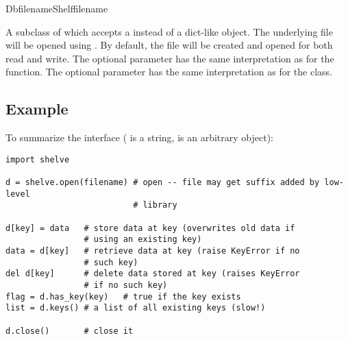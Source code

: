 \begin{classdesc}{DbfilenameShelf}{filename}

A subclass of  which accepts a  instead of a
dict-like object.  The underlying file will be opened using
{}.  By default, the file will be created and opened
for both read and write.  The optional  parameter has the same
interpretation as for the  function.  The optional
 parameter has the same interpretation as for the
{} class.
\end{classdesc}

\subsection{Example}

To summarize the interface ( is a string,  is an
arbitrary object):

\begin{verbatim}
import shelve

d = shelve.open(filename) # open -- file may get suffix added by low-level
                          # library

d[key] = data   # store data at key (overwrites old data if
                # using an existing key)
data = d[key]   # retrieve data at key (raise KeyError if no
                # such key)
del d[key]      # delete data stored at key (raises KeyError
                # if no such key)
flag = d.has_key(key)   # true if the key exists
list = d.keys() # a list of all existing keys (slow!)

d.close()       # close it
\end{verbatim}

\begin{seealso}
\end{seealso}
